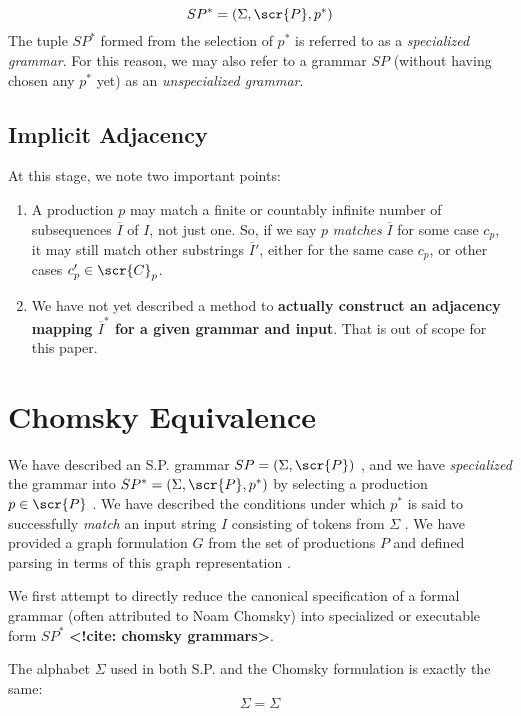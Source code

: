 \documentclass[10pt]{article}
\newcommand{\todocite}[1]{\textbf{<!cite: #1>}}
\begin{document}
\begin{equation}
  \label{eq:specialized}
  SP^* = (\Sigma, \scr{P}, p^*)
\end{equation}
The tuple $SP^*$ formed from the selection of $p^*$ is referred to as a \textit{specialized grammar}. For this reason, we may also refer to a grammar $SP$ (without having chosen any $p^*$ yet) as an \textit{unspecialized grammar}.

\subsection{Implicit Adjacency}
At this stage, we note two important points:
\begin{enumerate}
  \item A production $p$ may match a finite or countably infinite number of subsequences $\overbar{I}$ of $I$, not just one. So, if we say $p$ \textit{matches} $\overbar{I}$ for some case $c_p$, it may still match other substrings $\overbar{I}'$, either for the same case $c_p$, or other cases $c'_p \in \scr{C}_p$.
  \item We have not yet described a method to \textbf{actually construct an adjacency mapping $\overbar{I}^*$ for a given grammar and input}. That is out of scope for this paper.
\end{enumerate}

\section{Chomsky Equivalence}
\label{sec:chomsky-equivalence}
We have described an S.P. grammar $SP = (\Sigma, \scr{P})$ , and we have \textit{specialized} the grammar into $SP^* = (\Sigma, \scr{P}, p^*)$ by selecting a production $p \in \scr{P}$ . We have described the conditions under which $p^*$ is said to successfully \textit{match} an input string $I$ consisting of tokens from $\Sigma$ . We have provided a graph formulation $G$ from the set of productions $P$ and defined parsing in terms of this graph representation .

We first attempt to directly reduce the canonical specification of a formal grammar (often attributed to Noam Chomsky) into specialized or executable form $SP^*$ \todocite{chomsky grammars}.

The alphabet $\Sigma$ used in both S.P. and the Chomsky formulation is exactly the same:
\begin{equation}\label{eq:alphabet}
  \Sigma = \Sigma
\end{equation}
\end{document}
